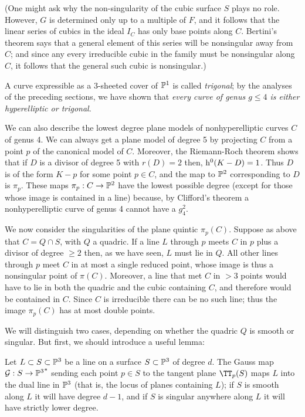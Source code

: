  (One might ask why the non-singularity of the cubic surface $S$ plays no role. However, $G$ is determined only up to a multiple of $F$, and it follows that the linear series of cubics in the ideal
$I_C$ has only base points along $C$. Bertini's theorem says that a general element of this series will be nonsingular away from $C$; and since any every irreducible cubic in the family must be nonsingular along $C$, it follows that the general such cubic is nonsingular.)

A curve expressible as a 3-sheeted cover of $\PP^1$ is called \emph{trigonal}; by the analyses of the preceding sections, we have shown that \emph{every curve of genus $g \leq 4$ is either hyperelliptic or trigonal}. 

We can also describe the lowest degree plane models of nonhyperelliptic curves $C$ of genus 4. 
We can always get a plane model of degree 5 by projecting $C$ from a point $p$ of the canonical model of $C$. Moreover, the Riemann-Roch theorem shows that if $D$ is a divisor of degree 5 with $r(D)=2$ then,  $\h^0(K-D) = 1$. Thus $D$ is of the form $K-p$ for some point $p \in C$, and the map to $\PP^2$ corresponding to $D$ is $\pi_p$. These  maps $\pi_p: C\to \PP^2$ have the lowest possible degree (except for those whose image is  contained in a line) because, by Clifford's theorem a nonhyperelliptic curve of genus 4 cannot have a $g^2_4$.

We now consider the singularities of the plane quintic $\pi_p(C)$. Suppose as above that $C = Q\cap S$, with $Q$ a quadric. If a line $L$ through $p$ meets $C$ in $p$ plus a divisor of degree $\geq 2$ then, as we have seen, $L$ must lie in $Q$.  All other lines through $p$ meet $C$ in at most a single reduced point,  whose image is thus a nonsingular point of $\pi(C)$. Moreover, a line that met $C$ in $>3$ points would have to lie in both the quadric and the cubic containing $C$, and therefore would be contained in $C$. Since $C$ is irreducible there can be no such line; thus the image $\pi_p(C)$ has at most double points.

We will distinguish two cases, depending on whether the quadric $Q$ is smooth or singular. But first, we should introduce a useful lemma:

\begin{lemma}
Let $L \subset S \subset \PP^3$ be a line on a surface $S \subset \PP^3$ of degree $d$. The Gauss map $\cG : S \to {\PP^3}^*$ sending each point $p \in S$ to the tangent plane $\TT_p(S)$ maps $L$ into the dual line in $\PP^3$ (that is, the locus of planes containing $L$); if $S$ is smooth along $L$ it will have degree $d-1$, and if $S$ is singular anywhere along $L$ it will have strictly lower degree.
\end{lemma}

